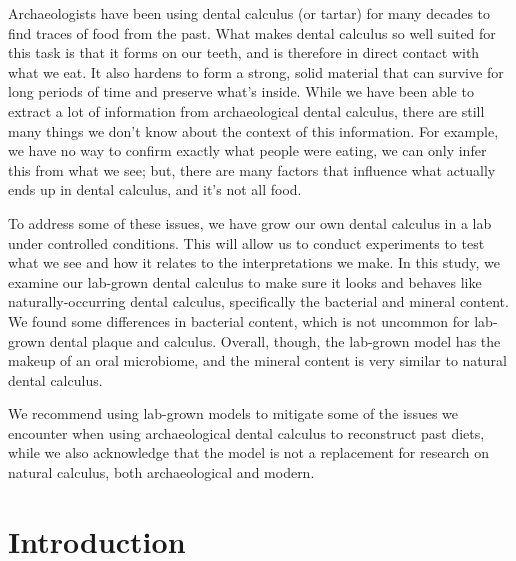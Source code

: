 \documentclass[10pt,a4paper]{article}
\begin{document}
Archaeologists have been using dental calculus (or tartar) for many decades
to find traces of food from the past. What makes dental calculus so well suited
for this task is that it forms on our teeth, and is therefore in direct
contact with what we eat. It also hardens to form a strong, solid material
that can survive for long periods of time and preserve what's inside.
While we have been able to extract a lot of information from archaeological 
dental calculus, there are still many things we don't know about the context
of this information.
For example, we have no way to confirm exactly what people were eating,
we can only infer this from what we see; but, there are many factors that
influence what actually ends up in dental calculus, and it's not all food.

To address some of these issues, we have grow our own
dental calculus in a lab under controlled conditions. This will allow
us to conduct experiments to test what we see and how it relates to the
interpretations we make.
In this study, we examine our lab-grown dental calculus to make sure it
looks and behaves like naturally-occurring dental calculus, specifically
the bacterial and mineral content. We found some differences in bacterial
content, which is not uncommon for lab-grown dental plaque and calculus.
Overall, though, the lab-grown model has the makeup of
an oral microbiome, and the mineral content is very similar to natural
dental calculus.

We recommend using lab-grown models to mitigate some of the
issues we encounter when using archaeological dental
calculus to reconstruct past diets, while we also acknowledge that the model
is not a replacement for research on natural calculus, both
archaeological and modern.

\section*{Introduction}
\end{document}
